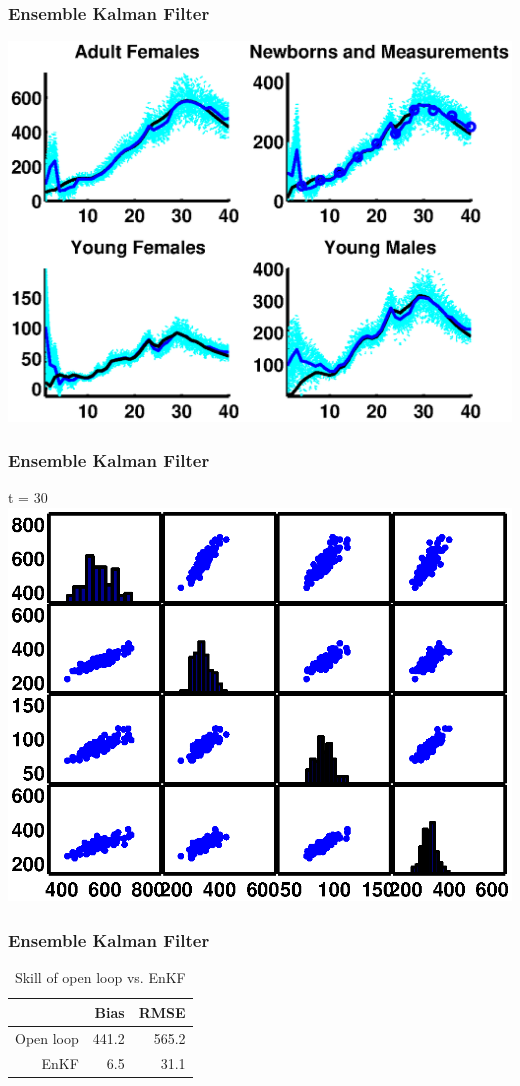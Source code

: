 \documentclass[mathserif]{beamer}
\begin{document}
\begin{frame}
\begin{center}
\frametitle{Ensemble Kalman Filter}
\includegraphics[width=1\textwidth]{filtered}
\end{center}
\end{frame}

\begin{frame}
\begin{center}
\frametitle{Ensemble Kalman Filter}
t = 30
\includegraphics[width=1\textwidth]{kf30cov}
\end{center}
\end{frame}

\begin{frame}
\begin{center}
\frametitle{Ensemble Kalman Filter}
\begin{table}
\begin{tabular}{rrr}
& Bias & RMSE \\
\hline
Open loop & 441.2 & 565.2 \\
EnKF & 6.5 & 31.1
\end{tabular}
\caption{Skill of open loop vs. EnKF}
\end{table}
\end{center}
\end{frame}
\end{document}
